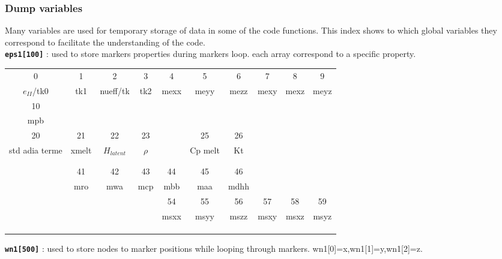 \subsubsection{Dump variables}
Many variables are used for temporary storage of data in some of the code functions. This index shows to which global variables they correspond to facilitate the understanding of the code. \\

\textbf{\texttt{eps1[100]}} : used to store markers properties during markers loop. each array correspond to a specific property. \\

\begin{tabular}{c c c c c c c c c c}
\hline
 0       & 1   & 2        & 3   & 4    &  5   & 6    & 7    &  8   & 9  \\ 
 $e_{II}$/tk0 & tk1 & nueff/tk & tk2 & mexx & meyy & mezz & mexy & mexz & meyz \\
\hline
10  & & & & & & & & &   \\ 
mpb & & & & & & & & &   \\
\hline
20             & 21    & 22           & 23     & & 25      & 26 & & & \\
std adia terme & xmelt & $H_{latent}$ & $\rho$ & & Cp melt & Kt & & & \\
\hline
   & & & & & & & & & \\ 
   & & & & & & & & & \\
\hline 
     & 41  & 42  & 43  & 44  & 45  & 46   & & & \\ 
     & mro & mwa & mcp & mbb & maa & mdhh & & & \\
\hline
 & & & & 54   & 55   & 56   & 57   & 58   & 59 \\ 
 & & & & msxx & msyy & mszz & msxy & msxz & msyz \\
\hline 
   & & & & & & & & &  \\ 
   & & & & & & & & &  \\
\hline
\label{marktable2}
\end{tabular}

\textbf{\texttt{wn1[500]}} : used to store nodes to marker positions while looping through markers. wn1[0]=x,wn1[1]=y,wn1[2]=z. \\

